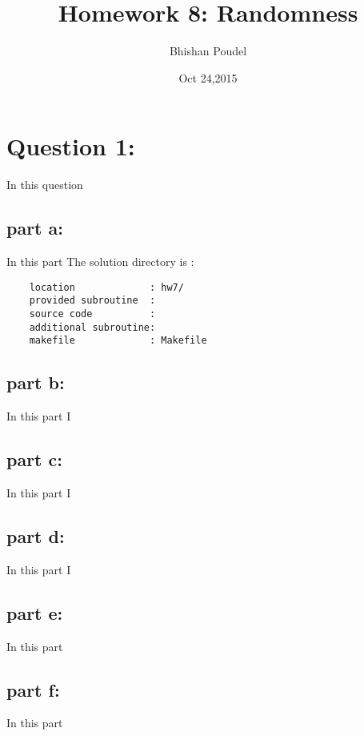 \documentclass[11pt,a4paper,english]{article}
\title{Homework 8: Randomness}
\author{Bhishan Poudel}
\date{Oct 24,2015}
\begin{document}
\maketitle
\tableofcontents
\listoffigures
\clearpage


\section{Question 1: }
In this question 

	
	\subsection{part a: }
	
	In this part 
	The solution directory is :\\
	\begin{verbatim}
	location             : hw7/
	provided subroutine  : 
	source code          : 
	additional subroutine: 
	makefile             : Makefile
	\end{verbatim}
	
	\subsection{part b: }
	
    In this part I 

   \subsection{part c: }
   In this part I 	
	
	
	\subsection{part d:  }
    In this part I 
	
	\subsection{part e: }
    In this part 
        
    \subsection{part f: }
    In this part 

\clearpage	
\end{document}
